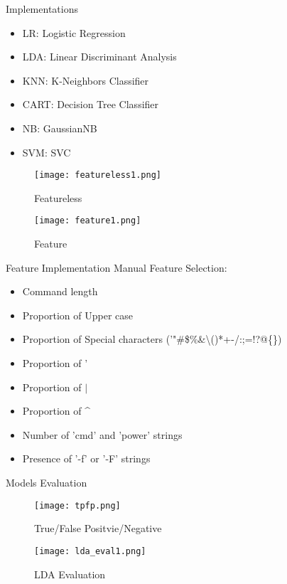 \begin{frame}{Implementations}
    \begin{itemize}
      \item LR: Logistic Regression
      \item LDA: Linear Discriminant Analysis
      \item KNN: K-Neighbors Classifier
      \item CART: Decision Tree Classifier
      \item NB: GaussianNB
      \item SVM: SVC
    \end{itemize}

    \begin{minipage}{0.5\textwidth}
        \centering
        \begin{figure}
    \texttt{[image: featureless1.png]}
        \caption{Featureless}
        \end{figure}
    \end{minipage}%
    \begin{minipage}{0.5\textwidth}
        \begin{figure}
        \centering
    \texttt{[image: feature1.png]}
        \caption{Feature}
        \end{figure}
    \end{minipage}
\end{frame}


\begin{frame}{Feature Implementation}
    Manual Feature Selection:
    \begin{itemize}
        \item Command length
        \item Proportion of Upper case
        \item Proportion of Special characters ('"\#\$\%\&\textbackslash ()*+-/:;=!?@\{\})
        \item Proportion of '
        \item Proportion of $\vert$
        \item Proportion of \^{}
        \item Number of 'cmd' and 'power' strings
        \item Presence of '-f' or '-F' strings
    \end{itemize}
\end{frame}


\begin{frame}{Models Evaluation}
    \begin{figure}
    \centering
    \texttt{[image: tpfp.png]}
    \caption{True/False Positvie/Negative}
    \end{figure}

    \begin{figure}
    \centering
    \texttt{[image: lda\_eval1.png]}
    \caption{LDA Evaluation}
    \end{figure}
\end{frame}

